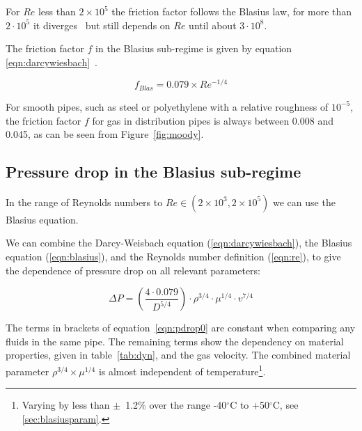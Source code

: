 \documentclass[5p]{elsarticle} %
\begin{document}
For $Re$ less than $2\times10^5$ the friction factor follows 
the Blasius law, for more than $2\cdot10^5$ it diverges~\cite{Allen2007} but still depends on $Re$ until about $3\cdot10^8$.

The friction factor $f$ in the Blasius sub-regime is given by equation \ref{eqn:darcywiesbach}~\citep{Bennet2017}.

\begin{equation}
\label{eqn:blasius}
f_{Blas} = 0.079 \times Re^{-1/4}
\end{equation}

 
For smooth pipes, such as steel or polyethylene with a relative roughness of $10^{-5}$, the friction factor $f$ for gas in distribution pipes is always between 0.008 and 0.045, as can be seen from Figure~\ref{fig:moody}.
\subsection{Pressure drop in the Blasius sub-regime}
\label{sec:pressuredrop}



In the 
range of  Reynolds numbers to $Re \in (2\times10^3,2\times10^5)$ we can use the Blasius equation.

We can combine the Darcy-Weisbach equation (\ref{eqn:darcywiesbach}), the Blasius equation (\ref{eqn:blasius}), and the Reynolds number definition (\ref{eqn:re}), to give the dependence of pressure drop on all relevant parameters:

\begin{equation}
\label{eqn:pdrop0}
\Delta P = \left ( \frac{4 \cdot 0.079}{D^{5/4}}\right ) \cdot \rho^{3/4} \cdot \mu^{1/4} \cdot v^{7/4}
\end{equation}

The terms in brackets of equation~\eqref{eqn:pdrop0} are constant when comparing any fluids in the same pipe. 
The remaining terms show the dependency on material properties, given in table~\ref{tab:dyn}, and the gas velocity.
The combined material parameter $\rho^{3/4} \times \mu^{1/4}$ is almost independent of 
temperature\footnote{
Varying by less than $\pm$~1.2\% over the range -40$^\circ$C to +50$^\circ$C, see \ref{sec:blasiusparam}.
}.
\end{document}
